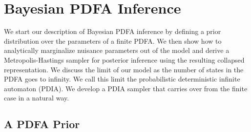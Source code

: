 \section{Bayesian PDFA Inference}
\label{sec:BPDFAs}

We start our description of Bayesian PDFA inference by defining a prior distribution over the parameters of a finite PDFA.  We then show how to analytically marginalize nuisance parameters out of the model and derive a Metropolis-Hastings sampler for posterior inference using the resulting collapsed representation.  We discuss the limit of our model as the number of states in the PDFA goes to infinity.  We call this limit the probabilistic deterministic infinite automaton (PDIA).  We develop a PDIA sampler that carries over from the finite case in a natural way.


\subsection{A PDFA Prior}

